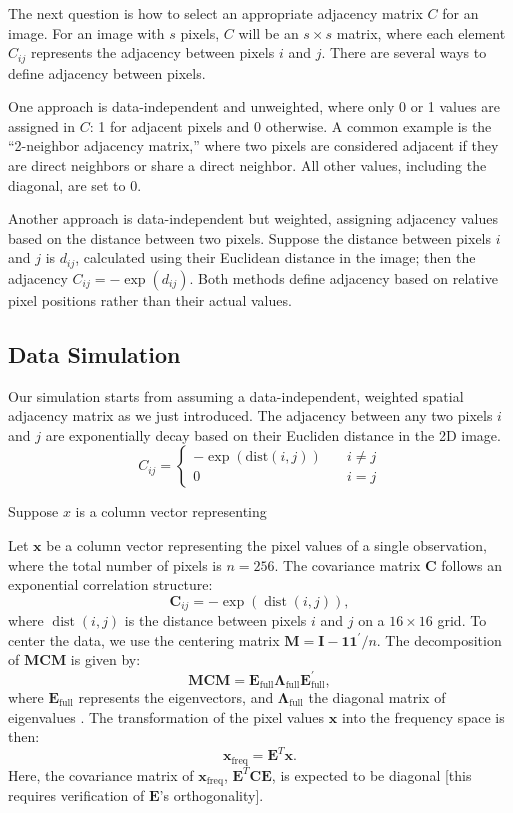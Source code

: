 \documentclass[12pt]{article}
\begin{document}
The next question is how to select an appropriate adjacency matrix \( C \) for an image. For an image with \( s \) pixels, \( C \) will be an \( s \times s \) matrix, where each element \( C_{ij} \) represents the adjacency between pixels \( i \) and \( j \). There are several ways to define adjacency between pixels. 

One approach is data-independent and unweighted, where only 0 or 1 values are assigned in \( C \): 1 for adjacent pixels and 0 otherwise. A common example is the “2-neighbor adjacency matrix,” where two pixels are considered adjacent if they are direct neighbors or share a direct neighbor. All other values, including the diagonal, are set to 0.

Another approach is data-independent but weighted, assigning adjacency values based on the distance between two pixels. Suppose the distance between pixels \( i \) and \( j \) is \( d_{ij} \), calculated using their Euclidean distance in the image; then the adjacency \( C_{ij} = - \exp(d_{ij}) \). Both methods define adjacency based on relative pixel positions rather than their actual values.



\subsection*{Data Simulation}

Our simulation starts from assuming a data-independent, weighted spatial adjacency matrix as we just introduced. The adjacency between any two pixels \( i \) and \( j \) are exponentially decay based on their Eucliden distance in the 2D image. 
\[
  C_{ij} = 
  \begin{cases}
    - \exp (\text{dist} (i, j)) & \quad i \neq j \\
    0                           & \quad i = j
  \end{cases}
\]

Suppose \( x \) is a column vector representing

Let \( \mathbf{x} \) be a column vector representing the pixel values of a single observation, where the total number of pixels is \( n = 256 \). The covariance matrix \( \mathbf{C} \) follows an exponential correlation structure:
\[
\mathbf{C}_{ij} = -\exp(\operatorname{dist}(i,j)),
\]
where \( \operatorname{dist}(i,j) \) is the distance between pixels \( i \) and \( j \) on a \( 16 \times 16 \) grid. To center the data, we use the centering matrix \( \mathbf{M} = \mathbf{I} - \mathbf{1} \mathbf{1}^{\prime} / n \). The decomposition of \( \mathbf{MCM} \) is given by:
\[
\mathbf{MCM} = \mathbf{E}_{\text{full}} \mathbf{\Lambda}_{\text{full}} \mathbf{E}_{\text{full}}^{\prime},
\]
where \( \mathbf{E}_{\text{full}} \) represents the eigenvectors, and \( \mathbf{\Lambda}_{\text{full}} \) the diagonal matrix of eigenvalues \cite{murakami2019eigenvector}. The transformation of the pixel values \( \mathbf{x} \) into the frequency space is then:
\[
\mathbf{x}_{\text{freq}} = \mathbf{E}^T \mathbf{x}.
\]
Here, the covariance matrix of \( \mathbf{x}_{\text{freq}} \), \( \mathbf{E}^T \mathbf{C} \mathbf{E} \), is expected to be diagonal [this requires verification of \( \mathbf{E} \)'s orthogonality].
\end{document}
